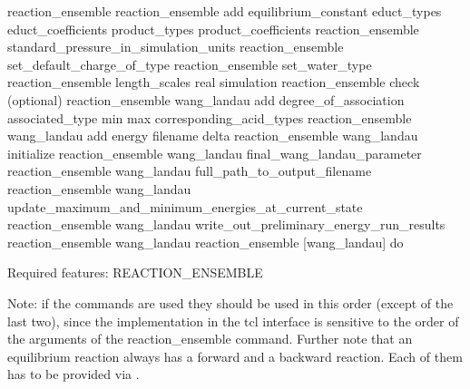 \begin{essyntax}
   reaction\_ensemble
   reaction\_ensemble add equilibrium_constant  educt\_types  educt_coefficients  product\_types  product\_coefficients 
   reaction\_ensemble standard\_pressure\_in\_simulation\_units 
   reaction\_ensemble set\_default\_charge\_of\_type  
   reaction\_ensemble set\_water\_type 
   reaction\_ensemble length\_scales real  simulation 
   reaction\_ensemble check (optional)
   reaction\_ensemble wang_landau add degree\_of\_association associated\_type  min  max  corresponding\_acid\_types 
   reaction\_ensemble wang\_landau add energy filename  delta 
   reaction\_ensemble wang\_landau initialize
   reaction\_ensemble wang\_landau final\_wang\_landau\_parameter 
   reaction\_ensemble wang\_landau full\_path\_to\_output\_filename 
   reaction\_ensemble wang\_landau update\_maximum\_and\_minimum\_energies\_at\_current\_state
   reaction\_ensemble wang\_landau write\_out\_preliminary\_energy\_run\_results 
   reaction_ensemble wang_landau  
   reaction\_ensemble [wang\_landau] do

  Required features: REACTION\_ENSEMBLE
\end{essyntax}
Note: if the commands are used they should be used in this order (except of the last two), since the implementation in the tcl interface is sensitive to the order of the arguments of the reaction\_ensemble command. Further note that an equilibrium reaction always has a forward and a backward reaction. Each of them has to be provided via .

